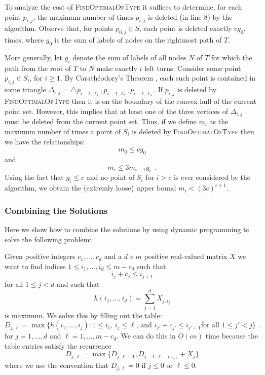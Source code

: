 \documentclass[lotsofwhite]{patmorin}
\begin{document}
To analyze the cost of \textsc{FindOptimalOfType} it suffices to
determine, for each point $p_{i,j}$, the maximum number of times
$p_{i,j}$ is deleted (in line 8) by the algorithm.  Observe that, for
points $p_{0,j}\in S$, each point is deleted exactly $cg_0$, times,
where $g_0$ is the sum of labels of nodes on the rightmost path of
$T$. 

More generally, let $g_i$ denote the sum of labels of all nodes $N$ of
$T$ for which the path from the root of $T$ to $N$ make exactly $i$
left turns.  Consider some point $p_{i,j}\in S_i$, for $i\ge 1$.  By
Carath\'eodory's Theorem \cite{chapter}, each such point is contained
in some triangle $\Delta_{i,j}=\triangle
p_{i-1,\ell_1},p_{i-1,\ell_2},p_{i-1,\ell_3}$. If $p_{i,j}$ is deleted
by \textsc{FindOptimalOfType} then it is on the boundary of the convex
hull of the current point set.  However, this implies that at least
one of the three vertices of $\Delta_{i,j}$ must be deleted from the
current point set.  Thus, if we define $m_i$ as the maximum number of
times a point of $S_i$ is deleted by \textsc{FindOptimalOfType} then
we have the relationships:
\[ m_0 \le cg_0 \] 
and 
\[ m_i \le 3 m_{i-1} g_i \enspace .\]
Using the fact that $g_i \le c$ and no point of $S_{i}$ for $i> c$ is
ever considered by the algorithm, we obtain the (extremly loose) upper
bound $m_i < (3c)^{c+1}$.


\subsubsection{Combining the Solutions}

Here we show how to combine the solutions by using dynamic programming
to solve the following problem:

Given positive integers $c_1,\ldots,c_d$ and a $d\times m$ positive
real-valued matrix $X$
we want to find indices $1\le i_1,\ldots,i_d \le m-c_d$ such that
\[
    i_j + c_j \le i_{j+1}
\]
for all $1\le j < d$ and such that
\[
      h(i_1,\ldots,i_d)=\sum_{j=1}^d X_{j,i_j}
\]
is maximum.  We solve this by filling out the table:
\[
     D_{j,\ell} = \max\{h(i_1,\ldots,i_j):
      \mbox{$1\le i_1$, $i_j\le \ell$, and $i_{j'}+c_{j'}\le i_{j'+1}$
             for all $1\le j'< j$}  \} \enspace .
\]
for $j=1,\ldots,d$ and $\ell=1,\ldots,m-c_d$.  We can do this in
$O(cn)$ time because the table entries satisfy the recurrence
\[
     D_{j,\ell} = \max\{D_{j,\ell-1},D_{j-1,\ell-c_{j-1}}+X_j \}
\]
where we use the convention that $D_{j,\ell} = 0$ if $j\le 0$ or
$\ell\le 0$.
\end{document}
